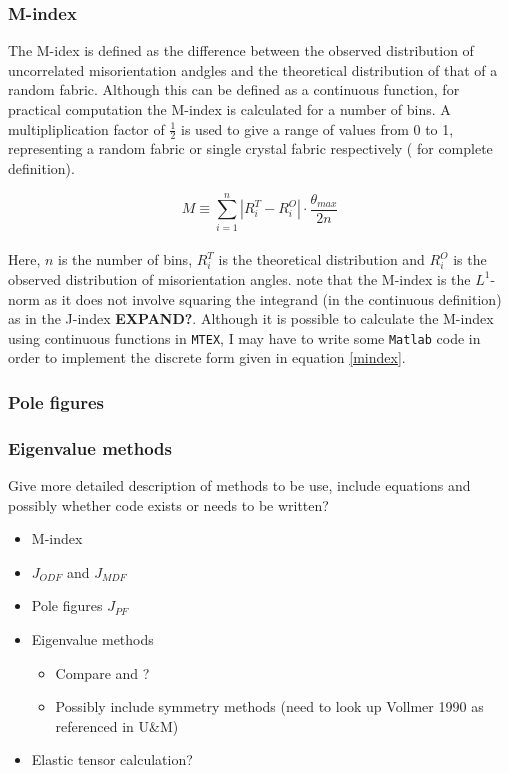 \documentclass[]{article}
\numberwithin{equation}{section}
\begin{document}
\subsubsection{M-index}
The M-idex is defined as the difference between the observed distribution of uncorrelated misorientation 
andgles and the theoretical distribution of that of a random fabric. Although this can be defined as a continuous function, 
for practical computation the M-index is calculated for a number of bins. A multipliplication factor of $\frac{1}{2}$ is used
to give a range of values from 0 to 1, representing a random fabric or single crystal fabric respectively (\cite{Skemer} for
complete definition). 

\begin{equation} \label{mindex}
M \equiv \sum_{i=1}^{n} | R^{T}_{i} - R^{O}_{i} | \cdot \frac{\theta_{max}}{2n} 
\end{equation}
\\
Here, $n$ is the number of bins, $R^{T}_{i}$ is the theoretical distribution and $R^{O}_{i}$ is the observed distribution
of misorientation angles. \cite{Mainprice} note that the M-index is the $L^1$-norm as it does not involve squaring the
integrand (in the continuous definition) as in the J-index \textbf{EXPAND?}. Although it is possible to calculate the M-index 
using continuous functions in \texttt{MTEX}, I may have to write some \texttt{Matlab} code in order to implement the discrete form given in equation \ref{mindex}.

\subsubsection{Pole figures}

\subsubsection{Eigenvalue methods}

Give more detailed description of methods to be use, include equations and possibly whether code exists or needs to be written?

\begin{itemize}
  \item M-index \citep{Skemer,Helmut}
  \item $J_{ODF}$ and $J_{MDF}$ \citep{Mainprice}
  \item Pole figures $J_{PF}$ 
  \item Eigenvalue methods 
    \begin{itemize}
	\item Compare \cite{Lisle} and \cite{Woodcock}?
	\item Possibly include symmetry methods \citep{Ulrich} (need to look up Vollmer 1990 as referenced in U\&M)
	\end{itemize}
  \item Elastic tensor calculation? \citep{Mainprice}
\end{itemize}
\end{document}
